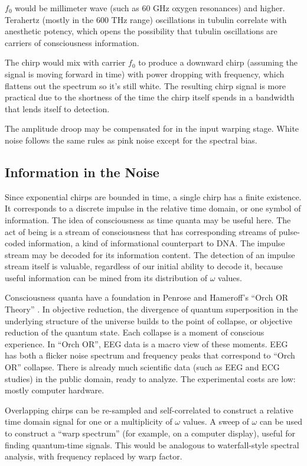$f_0$ would be millimeter wave (such as 60 GHz oxygen resonances) and higher.
Terahertz (mostly in the 600 THz range) oscillations in tubulin \cite{Craddock}
correlate with anesthetic potency, which opens the possibility that
tubulin oscillations are carriers of consciousness information.

The chirp would mix with carrier $f_0$ to produce a downward chirp
(assuming the signal is moving forward in time)
with power dropping with frequency,
which flattens out the spectrum so it's still white.
The resulting chirp signal is more practical due to the shortness of the
time the chirp itself spends in a bandwidth that lends itself to detection.

The amplitude droop may be compensated for in the input warping stage.
White noise follows the same rules as pink noise except for the spectral bias.

\subsection{Information in the Noise}

Since exponential chirps are bounded in time, a single chirp has a finite
existence. It corresponds to a discrete impulse in the relative time domain,
or one symbol of information.
The idea of consciousness as time quanta may be useful here.
The act of being is a stream of consciousness that has corresponding streams
of pulse-coded information, a kind of informational counterpart to DNA.
The impulse stream may be decoded for its information content.
The detection of an impulse stream itself is valuable,
regardless of our initial ability to decode it, because useful information
can be mined from its distribution of $\omega$ values.

Consciousness quanta have a foundation in Penrose and Hameroff's
``Orch OR Theory'' \cite{Hameroff}.
In objective reduction, the divergence of quantum superposition in the
underlying structure of the universe builds to the point of collapse,
or objective reduction of the quantum state.
Each collapse is a moment of conscious experience.
In ``Orch OR'', EEG data is a macro view of these moments.
EEG has both a flicker noise spectrum and frequency peaks that correspond
to ``Orch OR'' collapse.
There is already much scientific data (such as EEG and ECG studies) in the
public domain, ready to analyze.
The experimental costs are low: mostly computer hardware.

Overlapping chirps can be re-sampled and self-correlated to construct a relative
time domain signal for one or a multiplicity of $\omega$ values.
A sweep of $\omega$ can be used to construct a ``warp spectrum'' (for example,
on a computer display), useful for finding quantum-time signals.
This would be analogous to waterfall-style spectral analysis, with frequency
replaced by warp factor.

